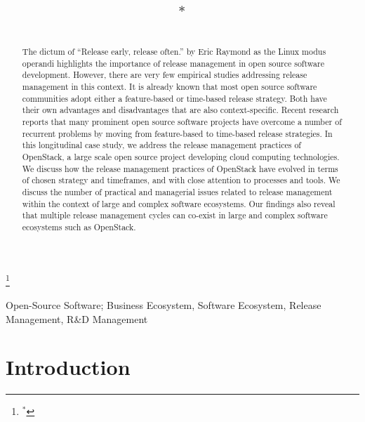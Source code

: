 \documentclass[dvipsnames]{interact}
\theoremstyle{plain}\newtheorem{theorem}{Theorem}[section]
\theoremstyle{definition}
\theoremstyle{remark}
\begin{document}
\title{\wptitle$^\ast$}
\thanks{$^\ast$\wpasin}

\author{
}

\maketitle






\begin{abstract} The dictum of ``Release early, release often.'' by Eric Raymond as the Linux modus operandi highlights the importance of release management in open source software development.  
However, there are very few empirical studies addressing release management in this context. 
It is already known that most open source software communities adopt either a feature-based or time-based release strategy. 
Both have their own advantages and disadvantages that are also context-specific. Recent research reports that many prominent open source software projects have overcome a number of recurrent problems by moving from feature-based to time-based release strategies.
In this longitudinal case study, we address the release management practices of OpenStack, a large scale open source project developing cloud computing technologies. We discuss how the release management practices of OpenStack have evolved in terms of chosen strategy and timeframes, and with close attention to processes and tools. We discuss the number of practical and managerial issues related to release management within the context of large and complex software ecosystems. Our findings also reveal that multiple release management cycles can co-exist in large and complex software ecosystems such as OpenStack. 
\end{abstract}



\begin{keywords}
Open-Source Software; Business Ecosystem, Software Ecosystem, Release Management, R\&D Management
\end{keywords}






\section{Introduction}
\end{document}
